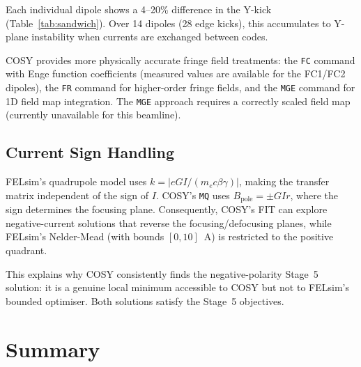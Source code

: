 \documentclass[11pt]{article}
\begin{document}
Each individual dipole shows a 4--20\% difference in the Y-kick
(Table~\ref{tab:sandwich}). Over 14 dipoles (28 edge kicks), this
accumulates to Y-plane instability when currents are exchanged between
codes.

COSY provides more physically accurate fringe field treatments:
the \texttt{FC} command with Enge function coefficients (measured values
are available for the FC1/FC2 dipoles), the \texttt{FR} command for
higher-order fringe fields, and the \texttt{MGE} command for 1D field map
integration. The \texttt{MGE} approach requires a correctly scaled
field map (currently unavailable for this beamline).

\subsection{Current Sign Handling}

FELsim's quadrupole model uses $k = |eGI/(m_e c \beta\gamma)|$,
making the transfer matrix independent of the sign of $I$.
COSY's \texttt{MQ} uses $B_\mathrm{pole} = \pm G I r$, where the sign
determines the focusing plane. Consequently, COSY's FIT can explore
negative-current solutions that reverse the focusing/defocusing planes,
while FELsim's Nelder-Mead (with bounds $[0, 10]$~A) is restricted to
the positive quadrant.

This explains why COSY consistently finds the negative-polarity Stage~5
solution: it is a genuine local minimum accessible to COSY but not to
FELsim's bounded optimiser. Both solutions satisfy the Stage~5 objectives.


\section{Summary}
\end{document}
